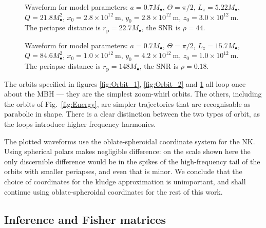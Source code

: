 \documentclass[useAMS,usedcolumn,usegraphicx,usenatbib]{mn2e}
\newcommand{\figref}[1]{Fig.~\ref{fig:#1}}
\newcommand{\units}[1]{\ensuremath{~\mathrm{#1}}}
\newcommand{\sub}[1]{\ensuremath{_\mathrm{#1}}}
\begin{document}
\begin{figure}
  \begin{center}
    \caption{Waveform for model parameters: $a = 0.7 M_\bullet$, $\Theta = \pi/2$, $L_z = 5.22 M_\bullet$, $Q = 21.8 M_\bullet^2$, $x_0 = 2.8 \times 10^{12}\units{m}$, $y_0 = 2.8 \times 10^{12}\units{m}$, $z_0 = 3.0 \times 10^{12}\units{m}$. The periapse distance is $r\sub{p} = 22.7 M_\bullet$, the SNR is $\rho = 44$.}
    \label{fig:Orbit_6}
  \end{center}
\end{figure}
\begin{figure}
  \begin{center}
    \caption{Waveform for model parameters: $a = 0.7 M_\bullet$, $\Theta = \pi/2$, $L_z = 15.7 M_\bullet$, $Q = 84.6 M_\bullet^2$, $x_0 = 1.0 \times 10^{12}\units{m}$, $y_0 = 4.2 \times 10^{12}\units{m}$, $z_0 = 1.0 \times 10^{12}\units{m}$. The periapse distance is $r\sub{p} = 148 M_\bullet$, the SNR is $\rho = 0.18$.}
    \label{fig:Orbit_7}
  \end{center}
\end{figure}
The orbits specified in figures \ref{fig:Orbit_1}, \ref{fig:Orbit_2} and \ref{fig:Orbit_6} all loop once about the MBH --- they are the simplest zoom-whirl orbits. The others, including the orbits of \figref{Energy}, are simpler trajectories that are recognisable as parabolic in shape. There is a clear distinction between the two types of orbit, as the loops introduce higher frequency harmonics.

The plotted waveforms use the oblate-spheroidal coordinate system for the NK. Using spherical polars makes negligible difference: on the scale shown here the only discernible difference would be in the spikes of the high-frequency tail of the orbits with smaller periapses, and even that is minor. We conclude that the choice of coordinates for the kludge approximation is unimportant, and shall continue using oblate-spheroidal coordinates for the rest of this work.

\subsection{Inference and Fisher matrices}
\end{document}
